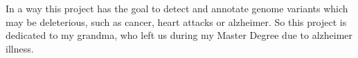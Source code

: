 \newenvironment{dedication}
  {\clearpage           %
   \thispagestyle{empty}%
   \vspace*{\stretch{1}}%
   \itshape             %
   \raggedleft          %
  }
  {\par %
   \vspace{\stretch{3}} %
   \clearpage           %
  }
\begin{dedication}
In a way this project has the goal to detect and annotate genome variants which may be deleterious, such as cancer, heart attacks or alzheimer.\newline
So this project is dedicated to my grandma, who left us during my Master Degree due to alzheimer illness.
\end{dedication}
